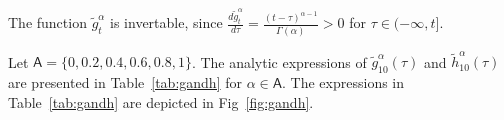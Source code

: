 \documentclass[twoside,reqno,11pt]{fcaa-var} %
\begin{document}
The function $\widetilde{g}_t^{\alpha}$ is invertable, since $\frac{d \widetilde{g}_t^{\alpha}}{d\tau}=\frac{(t-\tau)^{\alpha-1}}{\Gamma(\alpha)} > 0$ for $\tau\in(-\infty,t]$.




\noindent
Let $\mathsf{A} = \{0,0.2,0.4,0.6,0.8,1\}$. The analytic expressions of $\widetilde{g}_{10}^{\alpha}(\tau)$ and $\widetilde{h}_{10}^{\alpha}(\tau)$ are presented in Table~\ref{tab:gandh} for $\alpha\in\mathsf{A}$. The expressions in Table~\ref{tab:gandh} are depicted in Fig~\ref{fig:gandh}.
\end{document}
